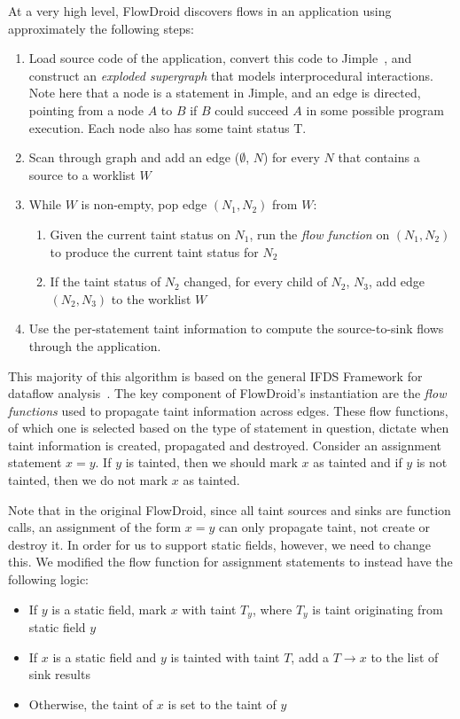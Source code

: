 At a very high level, FlowDroid discovers flows in an application using approximately the following steps:
\begin{enumerate}
\item Load source code of the application, convert this code to Jimple~\cite{soot}, and construct an \emph{exploded supergraph} that models interprocedural interactions. Note here that a node is a statement in Jimple, and an edge is directed, pointing from a node $A$ to $B$ if $B$ could succeed $A$ in some possible program execution. Each node also has some taint status T.
\item Scan through graph and add an edge ($\emptyset$, $N$) for every $N$ that contains a source to a worklist $W$
\item While $W$ is non-empty, pop edge $(N_1, N_2)$ from $W$:
\begin{enumerate}
\item Given the current taint status on $N_1$, run the \emph{flow function} on $(N_1, N_2)$ to produce the current taint status for $N_2$
\item If the taint status of $N_2$ changed, for every child of $N_2$, $N_3$, add edge $(N_2, N_3)$ to the worklist $W$
\end{enumerate}
\item Use the per-statement taint information to compute the source-to-sink flows through the application.
\end{enumerate}

This majority of this algorithm is based on the general IFDS Framework for dataflow analysis~\cite{ifds}. The key component of FlowDroid's instantiation are the \emph{flow functions} used to propagate taint information across edges. These flow functions, of which one is selected based on the type of statement in question, dictate when taint information is created, propagated and destroyed. Consider an assignment statement $x = y$. If $y$ is tainted, then we should mark $x$ as tainted and if $y$ is not tainted, then we do not mark $x$ as tainted. 

Note that in the original FlowDroid, since all taint sources and sinks are function calls, an assignment of the form $x = y$ can only propagate taint, not create or destroy it. In order for us to support static fields, however, we need to change this. We modified the flow function for assignment statements to instead have the following logic:

\begin{itemize}
\item If $y$ is a static field, mark $x$ with taint $T_y$, where $T_y$ is taint originating from static field $y$
\item If $x$ is a static field and $y$ is tainted with taint $T$, add a $T\rightarrow x$ to the list of sink results
\item Otherwise, the taint of $x$ is set to the taint of $y$
\end{itemize}

